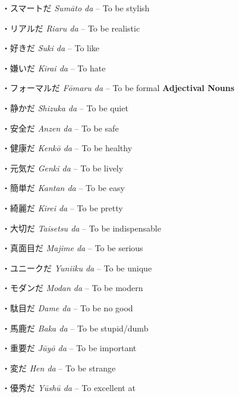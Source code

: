 \par{・スマートだ \emph{Sumāto da }– To be stylish }

\par{・リアルだ \emph{Riaru da }– To be realistic }

\par{・好きだ \emph{Suki da }– To like }

\par{・嫌いだ \emph{Kirai da }– To hate }

\par{・フォーマルだ \emph{Fōmaru da }– To be formal }
 \textbf{Adjectival Nouns }
\par{・静かだ \emph{Shizuka da }– To be quiet }
 
\par{・安全だ \emph{Anzen da }– To be safe }
 
\par{・健康だ \emph{Kenkō da }– To be healthy }
 
\par{・元気だ \emph{Genki da }– To be lively }
 
\par{・簡単だ \emph{Kantan da }– To be easy }
 
\par{・綺麗だ \emph{Kirei da }– To be pretty }
 
\par{・大切だ \emph{Taisetsu da }– To be indispensable }
 
\par{・真面目だ \emph{Majime da }– To be serious }
 
\par{・ユニークだ \emph{Yuniiku da }– To be unique }
 
\par{・モダンだ \emph{Modan da }– To be modern }
 
\par{・駄目だ \emph{Dame da }– To be no good }
 
\par{・馬鹿だ \emph{Baka da }– To be stupid\slash dumb }
 
\par{・重要だ \emph{Jūyō da }– To be important }
 
\par{・変だ \emph{Hen da }– To be strange }
 
\par{・優秀だ \emph{Yūshū da }– To excellent at }
 
